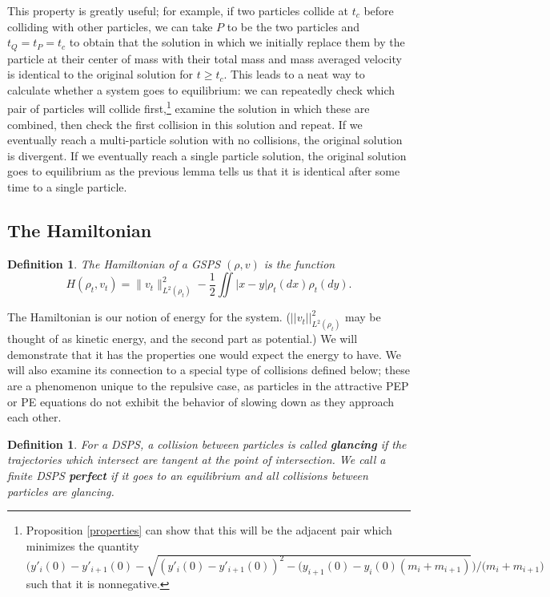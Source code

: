 \documentclass[11pt]{article}
\newtheorem{definition}[theorem]{Definition}
\numberwithin{equation}{section}
\begin{document}
    This property is greatly useful; for example, if two particles collide at $t_c$ before colliding with other particles, we can take $P$ to be the two particles and $t_Q = t_P = t_c$ to obtain that the solution in which we initially replace them by the particle at their center of mass with their total mass and mass averaged velocity is identical to the original solution for $t \ge t_c$. This leads to a neat way to calculate whether a system goes to equilibrium: we can repeatedly check which pair of particles will collide first,\footnote{Proposition \ref{properties} can show that this will be the adjacent pair which minimizes the quantity \mbox{$\big(y'_i(0) - y'_{i+1}(0) - \sqrt{(y'_i(0) - y'_{i+1}(0))^2 - (y_{i+1}(0) - y_i(0)(m_i + m_{i+1})}\big)/\big(m_i + m_{i+1}\big)$} such that it is nonnegative.} examine the solution in which these are combined, then check the first collision in this solution and repeat. If we eventually reach a multi-particle solution with no collisions, the original solution is divergent. If we eventually reach a single particle solution, the original solution goes to equilibrium as the previous lemma tells us that it is identical after some time to a single particle.
 
    \subsection{The Hamiltonian}
        \begin{definition}
            The Hamiltonian of a GSPS $(\rho, v)$ is the function 
            \begin{equation}\label{hamiltonian}
                H(\rho_t,v_t)=\|v_t\|_{L^2(\rho_t)}^2-\frac{1}{2}\iint|x-y|\rho_t(dx)\rho_t(dy).
            \end{equation}
        \end{definition}

        The Hamiltonian is our notion of energy for the system. ($||v_t||_{L^2(\rho_t)}^2$ may be thought of as kinetic energy, and the second part as potential.) We will demonstrate that it has the properties one would expect the energy to have. We will also examine its connection to a special type of collisions defined below; these are a phenomenon unique to the repulsive case, as particles in the attractive PEP or PE equations do not exhibit the behavior of slowing down as they approach each other. 
    
        \begin{definition}\label{glancing-perfect} For a DSPS, a collision between particles is called \textbf{glancing} if the trajectories which intersect are tangent at the point of intersection. We call a finite DSPS \textbf{perfect} if it goes to an equilibrium and all collisions between particles are glancing.\end{definition}
        
\end{document}
